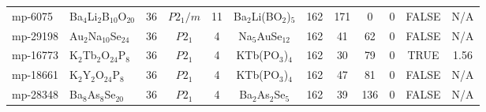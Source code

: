 {\begin{longtable}{llcccccccccc}
    mp-6075 & Ba$_{4}$Li$_{2}$B$_{10}$O$_{20}$ & 36    & $P2_1/m$ & 11    & Ba$_{2}$Li(BO$_{2}$)$_{5}$ & 162   & 171   & 0     & 0     & FALSE & N/A \\
    mp-29198 & Au$_{2}$Na$_{10}$Se$_{24}$ & 36    & $P2_1$ & 4     & Na$_{5}$AuSe$_{12}$ & 162   & 41    & 62    & 0     & FALSE & N/A \\
    mp-16773 & K$_{2}$Tb$_{2}$O$_{24}$P$_{8}$ & 36    & $P2_1$ & 4     & KTb(PO$_{3}$)$_{4}$ & 162   & 30    & 79    & 0     & TRUE  & 1.56  \\
    mp-18661 & K$_{2}$Y$_{2}$O$_{24}$P$_{8}$ & 36    & $P2_1$ & 4     & KTb(PO$_{3}$)$_{4}$ & 162   & 47    & 81    & 0     & FALSE & N/A \\
    mp-28348 & Ba$_{8}$As$_{8}$Se$_{20}$ & 36    & $P2_1$ & 4     & Ba$_{2}$As$_{2}$Se$_{5}$ & 162   & 39    & 136   & 0     & FALSE & N/A \\
\end{longtable}
}
